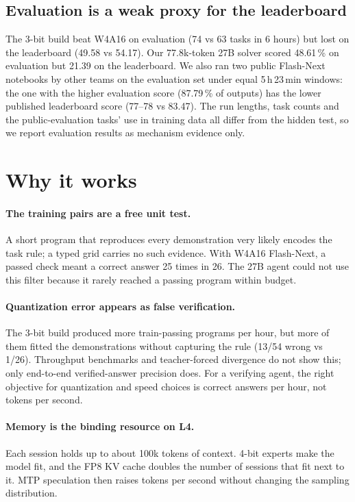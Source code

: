 \documentclass[11pt]{article}
\begin{document}
\subsection{Evaluation is a weak proxy for the leaderboard}
The 3-bit build beat W4A16 on evaluation (74 vs 63 tasks in 6 hours) but lost on the leaderboard (49.58 vs 54.17). Our 77.8k-token 27B solver scored 48.61\,\% on evaluation but 21.39 on the leaderboard. We also ran two public Flash-Next notebooks by other teams on the evaluation set under equal 5\,h\,23\,min windows: the one with the higher evaluation score (87.79\,\% of outputs) has the lower published leaderboard score (77--78 vs 83.47). The run lengths, task counts and the public-evaluation tasks' use in training data all differ from the hidden test, so we report evaluation results as mechanism evidence only.

\section{Why it works}
\paragraph{The training pairs are a free unit test.} A short program that reproduces every demonstration very likely encodes the task rule; a typed grid carries no such evidence. With W4A16 Flash-Next, a passed check meant a correct answer 25 times in 26. The 27B agent could not use this filter because it rarely reached a passing program within budget.

\paragraph{Quantization error appears as false verification.} The 3-bit build produced more train-passing programs per hour, but more of them fitted the demonstrations without capturing the rule (13/54 wrong vs 1/26). Throughput benchmarks and teacher-forced divergence do not show this; only end-to-end verified-answer precision does. For a verifying agent, the right objective for quantization and speed choices is correct answers per hour, not tokens per second.

\paragraph{Memory is the binding resource on L4.} Each session holds up to about 100k tokens of context. 4-bit experts make the model fit, and the FP8 KV cache doubles the number of sessions that fit next to it. MTP speculation then raises tokens per second without changing the sampling distribution.
\end{document}
